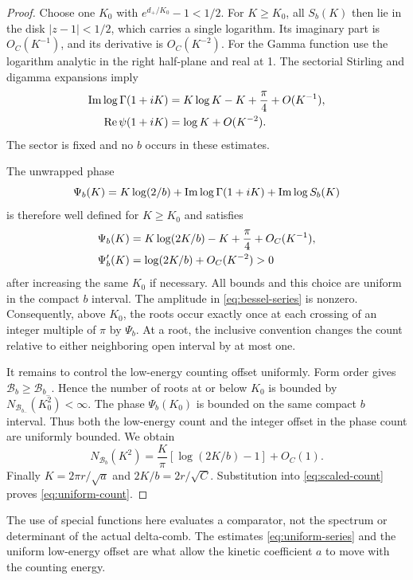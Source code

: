\begin{proof}
Choose one $K_0$ with $e^{d_+/K_0}-1<1/2$.
For $K\ge K_0$, all $S_b(K)$ then lie in the disk
$|z-1|<1/2$, which carries a single logarithm.
Its imaginary part is $O_C(K^{-1})$, and its derivative
is $O_C(K^{-2})$.
For the Gamma function use the logarithm analytic in
the right half-plane and real at 1.
The sectorial Stirling and digamma expansions
\citep[5.11.1--2]{nist2026dlmf} imply
\begin{align}
\operatorname{Im}\log\Gamma(1+iK)
 &=K\log K-K+\frac{\pi}{4}+O(K^{-1}),\notag\\
\operatorname{Re}\psi(1+iK)
 &=\log K+O(K^{-2}).
\label{eq:gamma-phase}
\end{align}
The sector is fixed and no $b$ occurs in these estimates.

The unwrapped phase
\[
\Psi_b(K)=K\log(2/b)+\operatorname{Im}\log\Gamma(1+iK)
                         +\operatorname{Im}\log S_b(K)
\]
is therefore well defined for $K\ge K_0$ and satisfies
\begin{align}
\Psi_b(K)
 &=K\log(2K/b)-K+\frac{\pi}{4}+O_C(K^{-1}),\notag\\
\Psi_b'(K)
 &=\log(2K/b)+O_C(K^{-2})>0
\label{eq:phase-monotone}
\end{align}
after increasing the same $K_0$ if necessary.
All bounds and this choice are uniform in the compact
$b$ interval.
The amplitude in \eqref{eq:bessel-series} is nonzero.
Consequently, above $K_0$, the roots occur exactly once
at each crossing of an integer multiple of $\pi$
by $\Psi_b$.
At a root, the inclusive convention changes the count
relative to either neighboring open interval by at most one.

It remains to control the low-energy counting offset
uniformly. Form order gives
$\mathcal B_b\ge\mathcal B_{b_-}$.
Hence the number of roots at or below $K_0$ is bounded
by $N_{\mathcal B_{b_-}}(K_0^2)<\infty$.
The phase $\Psi_b(K_0)$ is bounded on the same compact
$b$ interval. Thus both the low-energy count and
the integer offset in the phase count are uniformly bounded.
We obtain
\begin{equation}
N_{\mathcal B_b}(K^2)
=\frac K\pi\left[\log(2K/b)-1\right]+O_C(1).
\label{eq:scaled-count}
\end{equation}
Finally $K=2\pi r/\sqrt a$ and $2K/b=2r/\sqrt C$.
Substitution into \eqref{eq:scaled-count} proves
\eqref{eq:uniform-count}.
\end{proof}

The use of special functions here evaluates a comparator,
not the spectrum or determinant of the actual delta-comb.
The estimates \eqref{eq:uniform-series} and the uniform
low-energy offset are what allow the kinetic coefficient
$a$ to move with the counting energy.
